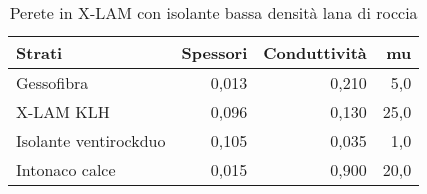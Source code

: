 \begin{table}[H]
\centering
\caption{Perete in X-LAM con isolante bassa densità lana di roccia}
\begin{tabular}{lrrr}
\toprule
                Strati & Spessori & Conduttività &    mu \\
\midrule
            Gessofibra &    0,013 &                0,210 &   5,0 \\
             X-LAM KLH &    0,096 &                0,130 &  25,0 \\
 Isolante ventirockduo &    0,105 &                0,035 &   1,0 \\
        Intonaco calce &    0,015 &                0,900 &  20,0 \\
\bottomrule
\end{tabular}
\end{table}
